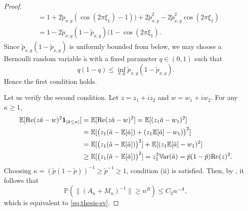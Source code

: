 \documentclass[11pt,oneside]{amsart}
\theoremstyle{plain}
\numberwithin{equation}{section}
\newcommand{\E}{\mathbb{E}}
\newcommand{\var}{\mathbb{V}\hspace{-1.pt}{\rm ar}}
\newcommand{\p}{\mathbb{P}}
\newcommand{\one}{\textup{\textbf{1}}}
\newcommand{\scaling}{s_n}
\begin{document}
\begin{proof}
\begin{equation}
\begin{split}
        &= 1 + 2\tilde p_{x,y}(\cos(2\pi  \xi_1)-1)\big)+2 \tilde p_{x,y}^2- 2\tilde p_{x,y}^2\cos(2\pi  \xi_1)\\
        &=1- 2\tilde p_{x,y}(1-\tilde p_{x,y}) (1- \cos(2\pi \xi_1). 
            \end{split}
    \end{equation}
    Since $\tilde p_{x,y}(1-\tilde p_{x,y})$ is uniformly bounded from below, we may choose a Bernoulli random variable $\tilde a$ with a fixed parameter $q\in (0,1)$ such that
    $$q(1-q)\le \inf_{x,y} \tilde p_{x,y}(1-\tilde p_{x,y}).$$
    Hence the first condition holds. 
    
    Let us verify the second condition. Let $z = z_1+iz_2$ and $w=w_1+i w_2$. For any $\kappa\ge 1$,
    \begin{equation}
    \begin{split}
        \E[{\rm Re}(z\tilde a-w)^2 \one_{|\tilde a \le \kappa|}]
        &=\E[{\rm Re}(z\tilde a-w)^2 ] 
        = \E[(z_1\tilde a-w_1)^2] \\
        &= \E[\big(z_1(\tilde a -\E[\tilde a])+(z_1\E[\tilde a]-w_1)\big)^2] \\
        &=\E[\big(z_1(\tilde a -\E[\tilde a])\big)^2]+\E[(z_1\E[\tilde a]-w_1)^2]\\ 
        &\ge \E[\big(z_1(\tilde a -\E[\tilde a])\big)^2] 
        = z_1^2 \var(\tilde a)
        =  \tilde p(1-\tilde p) {\rm Re}(z)^2.
        \end{split}
    \end{equation}
    Choosing $\kappa = (\tilde p(1-\tilde p))^{-1} \ge \tilde p^{-1} \ge 1$, condition (ii) is satisfied.
    Then, by \cite[Remark 2.8]{TV}, it follows that
    \begin{equation}
    \p\left(\|(A_n+M_n)^{-1}\| \ge n^{B}\right) \le C_3 n^{-A},
\end{equation}
which is equivalent to \eqref{eq:thesis-sv}.
\end{proof}
\end{document}
